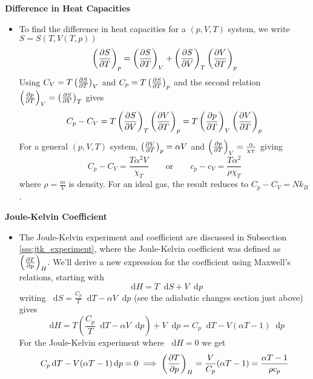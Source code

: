 \documentclass[11pt, a4paper]{article}
\newcommand{\eqtext}[1]{\qquad \text{#1} \qquad}
\newcommand{\diff}{\mathop{}\!\mathrm{d}} %
\newcommand{\pdveval}[3]{\left(\pdv{#1}{#2}\right)_{#3}}
\begin{document}
\smallskip
\textbf{Difference in Heat Capacities}
\begin{itemize}	
	\item To find the difference in heat capacities for a $ (p, V, T) $ system, we write $ S = S(T, V(T, p)) $
	\begin{equation*}
		\pdveval{S}{T}{p} = \pdveval{S}{T}{V} + \pdveval{S}{V}{T} \pdveval{V}{T}{p}
	\end{equation*}
	Using $ C_{V} = T \pdveval{S}{T}{V} $ and $ C_{p} = T \pdveval{S}{T}{p} $ and the second relation $ \pdveval{p}{T}{V} = \pdveval{S}{V}{T}$ gives
	\begin{equation*}
		C_{p} - C_{V} = T \pdveval{S}{V}{T} \pdveval{V}{T}{p} = T \pdveval{p}{T}{V} \pdveval{V}{T}{p}
	\end{equation*}
	For a general $ (p, V, T) $ system, $ \pdveval{V}{T}{p} = \alpha V $ and $ \pdveval{p}{T}{V} = \frac{\alpha}{\chi_{T}} $ giving
	\begin{equation*}
		C_{p} - C_{V} = \frac{T\alpha^{2}V}{\chi_{T}} \eqtext{or} c_{p} - c_{V} = \frac{T\alpha^{2}}{\rho \chi_{T}}
	\end{equation*}
	where $ \rho = \frac{m}{V} $ is density. For an ideal gas, the result reduces to $ C_{p}- C_{V} = Nk_{B} $.
\end{itemize}

\smallskip
\textbf{Joule-Kelvin Coefficient}
\begin{itemize}
	\item The Joule-Kelvin experiment and coefficient are discussed in Subsection \ref{sss:jtk_experiment}, where the Joule-Kelvin coefficient was defined as $ \pdveval{T}{p}{H} $. We'll derive a new expression for the coefficient using Maxwell's relations, starting with 
	\begin{equation*}
		\diff H = T \diff S + V \diff p
	\end{equation*}
	writing $ \diff S = \frac{C_{p}}{T} \diff T - \alpha V \diff p  $ (see the adiabatic changes section just above) gives
	\begin{equation*}
		\diff H = T \left(\frac{C_{p}}{T} \diff T - \alpha V \diff p\right) + V \diff p = C_{p}\diff T - V(\alpha T - 1)\diff p
	\end{equation*} 
	For the Joule-Kelvin experiment where $ \diff H = 0 $ we get
	\begin{equation*}
		C_{p}\diff T - V(\alpha T - 1)\diff p = 0 \implies \pdveval{T}{p}{H} = \frac{V}{C_{p}}(\alpha T - 1) = \frac{\alpha T - 1}{\rho c_{p}}
	\end{equation*}
\end{itemize}
\end{document}
